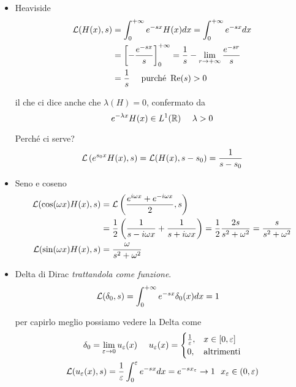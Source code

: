 \begin{itemize}
\item Heaviside
\begin{align*}
\mathcal{L}(H(x), s) & = \int^{+ \infty}_{0} e^{- sx} H(x) dx = \int^{+ \infty}_{0} e^{- sx} dx\\
 & = \left[- \frac{e^{- sx}}{s}\right]^{+ \infty}_{0} = \frac{1}{s} - \lim_{r\rightarrow + \infty}\frac{e^{- sr}}{s}\\
 & = \frac{1}{s} \ \ \ \ \text{purché} \ \operatorname{Re} (s) > 0
\end{align*}

il che ci dice anche che $\lambda (H) = 0$, confermato da
\begin{equation*}
e^{- \lambda x} H(x) \in L^{1}(\mathbb{R}) \ \ \ \ \lambda > 0
\end{equation*}

Perché ci serve?
\begin{equation*}
\mathcal{L}\left(e^{s_{0} x} H(x), s\right) = \mathcal{L}(H(x), s - s_{0}) = \frac{1}{s - s_{0}}
\end{equation*}
\item Seno e coseno
\begin{align*}
\mathcal{L}(\cos(\omega x) H(x), s) & = \mathcal{L}\left(\frac{e^{i\omega x} + e^{- i\omega x}}{2}, s\right)\\
 & = \frac{1}{2}\left(\frac{1}{s - i\omega x} + \frac{1}{s + i\omega x}\right) = \frac{1}{2}\frac{2s}{s^{2} + \omega^{2}} = \frac{s}{s^{2} + \omega^{2}}\\
\mathcal{L}(\sin(\omega x) H(x), s) & = \frac{\omega}{s^{2} + \omega^{2}}
\end{align*}
\item Delta di Dirac \textit{trattandola come funzione}.
\begin{align*}
\mathcal{L}(\delta_{0}, s) & = \int^{+ \infty}_{0} e^{- sx} \delta_{0}(x) dx = 1
\end{align*}

per capirlo meglio possiamo vedere la Delta come
\begin{gather*}
\delta_{0} = \lim\limits_{\varepsilon \rightarrow 0} u_{\varepsilon}(x) \ \ \ \ u_{\varepsilon}(x) =
\begin{cases}
\frac{1}{\varepsilon}, & x\in [0, \varepsilon]\\
0, & \text{altrimenti}
\end{cases}\\
\mathcal{L}(u_{\varepsilon}(x), s) = \frac{1}{\varepsilon}\int^{\varepsilon}_{0} e^{- sx} dx = e^{- sx_{\varepsilon}}\rightarrow 1\ \ x_{\varepsilon} \in (0, \varepsilon)
\end{gather*}
\end{itemize}
